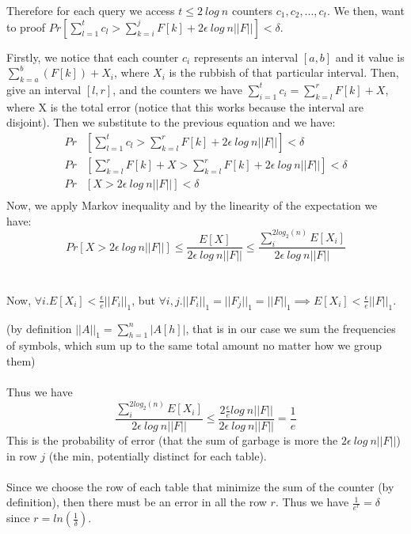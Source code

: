 \documentclass[a4paper]{article}
\begin{document}
Therefore for each query we access $t \leq 2\ log\ n$ counters $c_1,c_2,...,c_t$. We then, want to proof $Pr[\sum^t_{l=1}c_l > \sum^j_{k=i}F[k] + 2\epsilon\ log\ n ||F||]<\delta$.

Firstly, we notice that each counter $c_i$ represents an interval $[a,b]$ and it value is $\sum_{k=a}^b (F[k]) + X_i$, where $X_i$ is the rubbish of that particular interval. Then, give an interval $[l,r]$, and the counters we have $\sum^t_{i=1}c_i = \sum^r_{k=l}F[k] +X $, where X is the total error (notice that this works because the interval are disjoint). Then we substitute to the previous equation and we have:
\begin{align*}
Pr &[\sum^t_{l=1}c_l > \sum^r_{k=l}F[k] + 2\epsilon\ log\ n ||F||]<\delta \\
Pr &[ \sum^r_{k=l}F[k] +X  > \sum^r_{k=l}F[k] + 2\epsilon\ log\ n ||F||]<\delta \\
Pr &[ X  >  2\epsilon\ log\ n ||F||]<\delta \\
\end{align*}
Now, we apply Markov inequality and by the linearity of the expectation we have: $$Pr [ X  >  2\epsilon\ log\ n ||F||] \leq \frac{E[X]}{2\epsilon\ log\ n ||F||} \leq \frac{\sum_{i}^{2log_2(n)} E[X_i]}{2\epsilon\ log\ n ||F||}$$
\\
\\
Now, $\forall i.E[X_i]< \frac{\epsilon}{e}||F_i||_1$, but $\forall  i, j.||F_i||_1 = ||F_j||_1 = ||F||_1 \implies E[X_i]< \frac{\epsilon}{e}||F||_1$.

\noindent
(by definition $||A||_1 = \sum^n_{h=1}|A[h]|$, that is in our case we sum the frequencies of symbols, which sum up to the same total amount no matter how we group them)
\\
\\
Thus we have $$\frac{\sum_{i}^{2log_2(n)} E[X_i]}{2\epsilon\ log\ n ||F||} \leq \frac{2 \frac{\epsilon}{e}log \ n||F||}{2\epsilon\ log\ n ||F||}= \frac{1}{e}$$
This is the probability of error (that the sum of garbage is more the $2\epsilon\ log\ n ||F||$) in row $j$ (the min, potentially distinct for each table).
\\
\\
Since we choose the row of each table that minimize the sum of the counter (by definition), then there must be an error in all the row $r$. Thus we have $\frac{1}{e^r}=\delta$ since $r=ln(\frac{1}{\delta})$.
\end{document}
